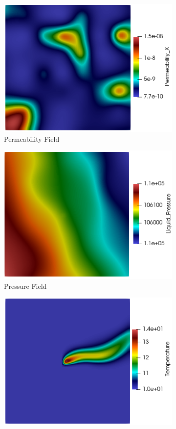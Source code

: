 \documentclass{article} %
\begin{document}
\begin{figure}
\centering
\begin{subfigure}{.33\textwidth}
  \centering
  \includegraphics[width=.8\linewidth]{perm_example.png}
  \caption{Permeability Field}
  \label{fig:sub1_perm}
\end{subfigure}%
\begin{subfigure}{.33\textwidth}
  \centering
  \includegraphics[width=.8\linewidth]{pressure_example.png}
  \caption{Pressure Field}
  \label{fig:sub1_pressure}
\end{subfigure}
\begin{subfigure}{.33\textwidth}
  \centering
  \includegraphics[width=.8\linewidth]{temp_example.png}

\end{subfigure}
\end{figure}
\end{document}
